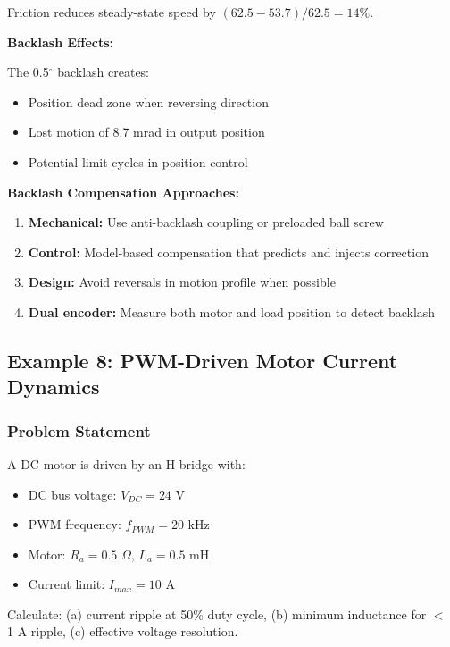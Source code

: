 Friction reduces steady-state speed by $(62.5 - 53.7)/62.5 = 14\%$.

\textbf{Backlash Effects:}

The 0.5$^\circ$ backlash creates:
\begin{itemize}
    \item Position dead zone when reversing direction
    \item Lost motion of 8.7 mrad in output position
    \item Potential limit cycles in position control
\end{itemize}

\textbf{Backlash Compensation Approaches:}

\begin{enumerate}
    \item \textbf{Mechanical:} Use anti-backlash coupling or preloaded ball screw
    \item \textbf{Control:} Model-based compensation that predicts and injects correction
    \item \textbf{Design:} Avoid reversals in motion profile when possible
    \item \textbf{Dual encoder:} Measure both motor and load position to detect backlash
\end{enumerate}

\subsection{Example 8: PWM-Driven Motor Current Dynamics}

\subsubsection{Problem Statement}

A DC motor is driven by an H-bridge with:
\begin{itemize}
    \item DC bus voltage: $V_{DC} = 24$ V
    \item PWM frequency: $f_{PWM} = 20$ kHz
    \item Motor: $R_a = 0.5$ $\Omega$, $L_a = 0.5$ mH
    \item Current limit: $I_{max} = 10$ A
\end{itemize}

Calculate: (a) current ripple at 50\% duty cycle, (b) minimum inductance for $<$ 1 A ripple, (c) effective voltage resolution.

